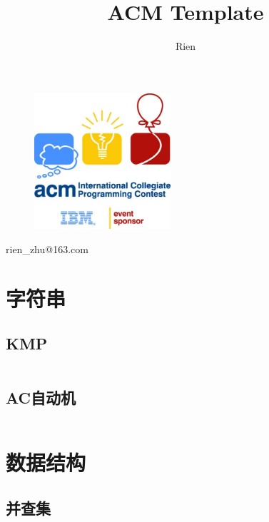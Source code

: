 \documentclass[a4paper,11pt]{article}
\author{Rien}
\title{ACM Template}
\begin{document}
\maketitle %
\thispagestyle{empty}%

\begin{figure}[H]
    \centering
    \includegraphics[width=0.45\textwidth,]{picture/logo.jpg}
    \vspace{0.5cm}
\end{figure}
\centerline{rien\_zhu@163.com}
\newpage %
\tableofcontents %
\thispagestyle{empty}%
\newpage
\setcounter{page}{1}%
\section{字符串}
\subsection{KMP}
\inputminted[breaklines,linenos,frame=leftline]{c++}{string/kmp.cpp}

\subsection{AC自动机}
\inputminted[breaklines,linenos,frame=leftline]{c++}{string/ac.cpp}

\newpage
\section{数据结构}

\subsection{并查集}
\end{document}
